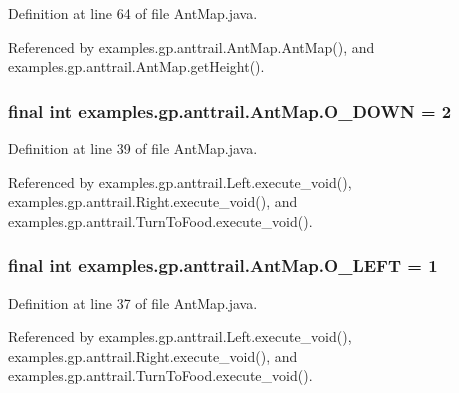 Definition at line 64 of file Ant\-Map.\-java.



Referenced by examples.\-gp.\-anttrail.\-Ant\-Map.\-Ant\-Map(), and examples.\-gp.\-anttrail.\-Ant\-Map.\-get\-Height().

\hypertarget{classexamples_1_1gp_1_1anttrail_1_1_ant_map_a91f09a31af79ae14af8fdce70d087b2d}{
\subsubsection[{O\-\_\-\-D\-O\-W\-N}]{\setlength{\rightskip}{0pt plus 5cm}final int examples.\-gp.\-anttrail.\-Ant\-Map.\-O\-\_\-\-D\-O\-W\-N = 2\hspace{0.3cm}{\ttfamily [static]}}}\label{classexamples_1_1gp_1_1anttrail_1_1_ant_map_a91f09a31af79ae14af8fdce70d087b2d}


Definition at line 39 of file Ant\-Map.\-java.



Referenced by examples.\-gp.\-anttrail.\-Left.\-execute\-\_\-void(), examples.\-gp.\-anttrail.\-Right.\-execute\-\_\-void(), and examples.\-gp.\-anttrail.\-Turn\-To\-Food.\-execute\-\_\-void().

\hypertarget{classexamples_1_1gp_1_1anttrail_1_1_ant_map_a406e10be0612f74b46ad6a59a1c0cb0b}{
\subsubsection[{O\-\_\-\-L\-E\-F\-T}]{\setlength{\rightskip}{0pt plus 5cm}final int examples.\-gp.\-anttrail.\-Ant\-Map.\-O\-\_\-\-L\-E\-F\-T = 1\hspace{0.3cm}{\ttfamily [static]}}}\label{classexamples_1_1gp_1_1anttrail_1_1_ant_map_a406e10be0612f74b46ad6a59a1c0cb0b}


Definition at line 37 of file Ant\-Map.\-java.



Referenced by examples.\-gp.\-anttrail.\-Left.\-execute\-\_\-void(), examples.\-gp.\-anttrail.\-Right.\-execute\-\_\-void(), and examples.\-gp.\-anttrail.\-Turn\-To\-Food.\-execute\-\_\-void().

